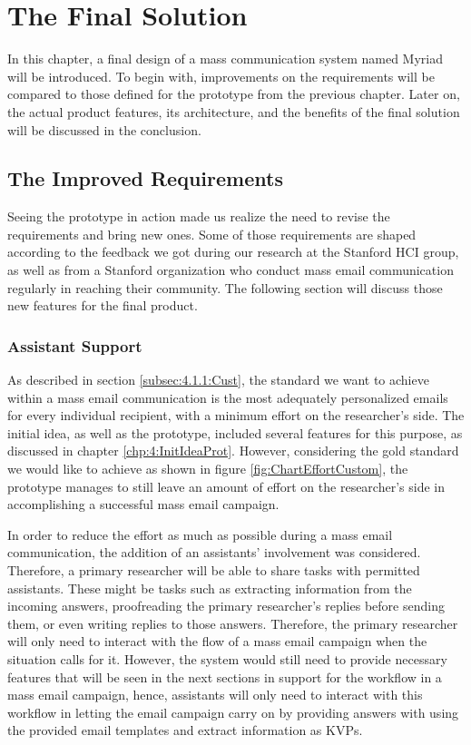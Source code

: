 \chapter{The Final Solution}
\label{chp:5:FinaSolu}
In this chapter, a final design of a mass communication system named Myriad will be introduced. To begin with, improvements on the requirements will be compared to those defined for the prototype from the previous chapter. Later on, the actual product features, its architecture, and the benefits of the final solution will be discussed in the conclusion.

\section{The Improved Requirements}
\label{sec:5.1:ImprRequ}

Seeing the prototype in action made us realize the need to revise the requirements and bring new ones. Some of those requirements are shaped according to the feedback we got during our research at the Stanford \ac{HCI} group, as well as from a Stanford organization who conduct mass email communication regularly in reaching their community. The following section will discuss those new features for the final product.

\subsection{Assistant Support}
\label{subsec:5.1.1:AssiSupp}
As described in section \ref{subsec:4.1.1:Cust}, the standard we want to achieve within a mass email communication is the most adequately personalized emails for every individual recipient, with a minimum effort on the researcher's side. The initial idea, as well as the prototype, included several features for this purpose, as discussed in chapter \ref{chp:4:InitIdeaProt}. However, considering the gold standard we would like to achieve as shown in figure \ref{fig:ChartEffortCustom}, the prototype manages to still leave an amount of effort on the researcher's side in accomplishing a successful mass email campaign.
\vspace{1cm}

In order to reduce the effort as much as possible during a mass email communication, the addition of an assistants' involvement was considered. Therefore, a primary researcher will be able to share tasks with permitted assistants. These might be tasks such as extracting information from the incoming answers, proofreading the primary researcher's replies before sending them, or even writing replies to those answers. Therefore, the primary researcher will only need to interact with the flow of a mass email campaign when the situation calls for it. However, the system would still need to provide necessary features that will be seen in the next sections in support for the workflow in a mass email campaign, hence, assistants will only need to interact with this workflow in letting the email campaign carry on by providing answers with using the provided email templates and extract information as \ac{KVP}s.


